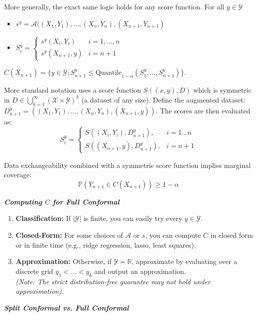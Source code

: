 More generally, the exact same logic holds for any score function. For all $y \in \mathcal{Y}$
\begin{itemize}
    \item $s^y = \mathcal{A}((X_1,Y_1),\dots,(X_n,Y_n), (X_{n+1},Y_{n+1})$
    \item $S_i^y = \begin{cases}
        s^y(X_i,Y_i) & i=1,\dots,n\\
        s^y(X_{n+1},y) & i=n+1
    \end{cases}
    $
\end{itemize}
$C(X_{n+1}) = \{y\in\mathcal{Y}\colon S^y_{n+1} \leq \text{Quantile}_{1-\alpha}(S_1^y, \dots, S_{n+1}^y)\}$.

More standard notation uses a score function $S((x,y), D)$ which is symmetric in $D \in \bigcup_{k=1}^\infty (\mathcal{X} \times \mathcal{Y})^k$ (a dataset of any size). Define the augmented dataset: $D_{n+1}^y = ((X_1, Y_1), \dots, (X_n, Y_n), (X_{n+1}, y))$. The scores are then evaluated as:
\[ S_i^y = \begin{cases} S((X_i, Y_i), D_{n+1}^y), & i=1 \dots n \\ S((X_{n+1}, y), D_{n+1}^y), & i=n+1 \end{cases} \]

Data exchangeability combined with a symmetric score function implies marginal coverage:
\[ \mathbb{P}(Y_{n+1} \in C(X_{n+1})) \ge 1-\alpha \]

\vspace{0.5cm}

\emph{\textbf{Computing $C$ for Full Conformal}}

\begin{enumerate}
    \item \textbf{Classification:} If $|\mathcal{Y}|$ is finite, you can easily try every $y \in \mathcal{Y}$.
    \item \textbf{Closed-Form:} For some choices of $\mathcal{A}$ or $s$, you can compute $C$ in closed form or in finite time (e.g., ridge regression, lasso, least squares).
    \item \textbf{Approximation:} Otherwise, if $\mathcal{Y} = \mathbb{R}$, approximate by evaluating over a discrete grid $y_1 < \dots < y_k$ and output an approximation. \\
    \textit{(Note: The strict distribution-free guarantee may not hold under approximation).}
\end{enumerate}

\emph{\textbf{Split Conformal vs. Full Conformal}}

